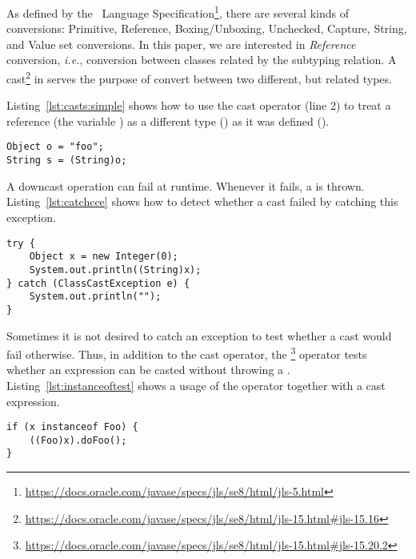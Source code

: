 As defined by the~\java{} Language Specification\footnote{\url{https://docs.oracle.com/javase/specs/jls/se8/html/jls-5.html}},
there are several kinds of conversions:
Primitive, Reference, Boxing/Unboxing, Unchecked, Capture, String, and Value set conversions.
In this paper, we are interested in \emph{Reference} conversion, \emph{i.e.}, conversion between classes related by the subtyping relation.
A cast\footnote{\url{https://docs.oracle.com/javase/specs/jls/se8/html/jls-15.html\#jls-15.16}} in \java{} serves the purpose of convert between two different, but related types.

Listing~\ref{lst:casts:simple} shows how to use the cast operator (line 2) to treat a reference (the variable ) as a different type () as it was defined ().

\begin{lstlisting}[style=java,label=lst:casts:simple,caption=Variable \code{o} (defined as \code{Object}) is casted to \code{String}.]
Object o = "foo"; 
String s = (String)o;
\end{lstlisting}

A downcast operation can fail at runtime.
Whenever it fails, a  is thrown.
Listing~\ref{lst:catchcce} shows how to detect whether a cast failed by catching this exception.

\begin{lstlisting}[style=java,label=lst:catchcce,caption={Catching \code{ClassCastException}}]
try {
	Object x = new Integer(0);
	System.out.println((String)x); 
} catch (ClassCastException e) { 
	System.out.println(""); 
} 
\end{lstlisting}

Sometimes it is not desired to catch an exception to test whether a cast would fail otherwise. 
Thus, in addition to the cast operator, the \footnote{\url{https://docs.oracle.com/javase/specs/jls/se8/html/jls-15.html\#jls-15.20.2}} operator tests whether an expression can be casted without throwing a .
Listing~\ref{lst:instanceoftest} shows a usage of the  operator together with a cast expression.

\begin{lstlisting}[style=java,label=lst:instanceoftest,caption=Runtime type test using \code{instanceof} before applying a cast.]
if (x instanceof Foo) {
	((Foo)x).doFoo();
}
\end{lstlisting}


